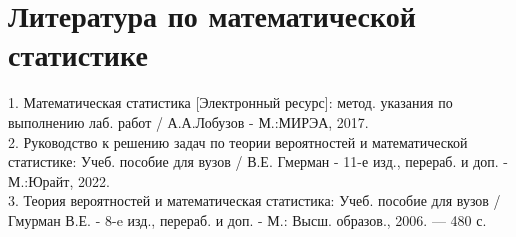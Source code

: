 \section{Литература по математической статистике}

1. Математическая статистика [Электронный ресурс]: 
метод. указания по выполнению лаб. работ / А.А.Лобузов - М.:МИРЭА, 2017. \\
2. Руководство к решению задач по теории вероятностей и математической статистике:
Учеб. пособие для вузов / В.Е. Гмерман - 11-е изд., перераб. и доп. - М.:Юрайт, 2022. \\
3.  Теория вероятностей и математическая статистика: Учеб. пособие
для вузов / Гмурман В.Е. - 8-e изд., перераб. и доп. - М.: Высш. образов., 2006. — 480 с. \\

